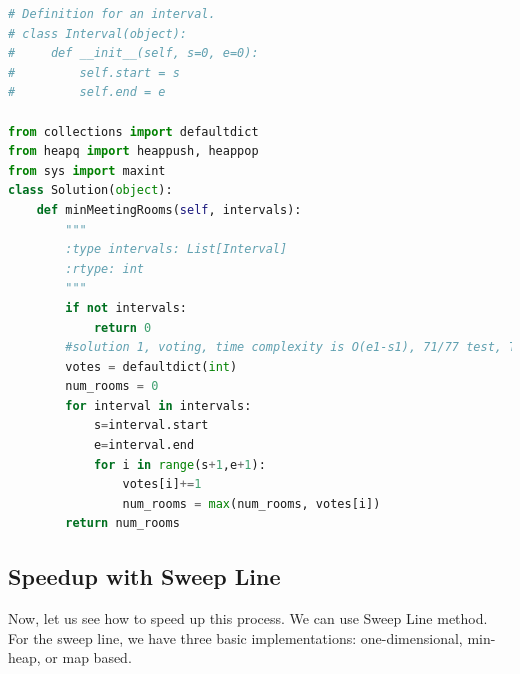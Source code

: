 \documentclass[../../main.tex]{subfiles}
\begin{document}
\begin{lstlisting}[language = Python]
# Definition for an interval.
# class Interval(object):
#     def __init__(self, s=0, e=0):
#         self.start = s
#         self.end = e

from collections import defaultdict
from heapq import heappush, heappop
from sys import maxint
class Solution(object):
    def minMeetingRooms(self, intervals):
        """
        :type intervals: List[Interval]
        :rtype: int
        """
        if not intervals:
            return 0
        #solution 1, voting, time complexity is O(e1-s1), 71/77 test, TLE
        votes = defaultdict(int)
        num_rooms = 0   
        for interval in intervals:
            s=interval.start
            e=interval.end
            for i in range(s+1,e+1):
                votes[i]+=1
                num_rooms = max(num_rooms, votes[i])
        return num_rooms
\end{lstlisting}
\subsection{Speedup with Sweep Line}
Now, let us see how to speed up this process. We can use Sweep Line method. For the sweep line, we have three basic implementations: one-dimensional, min-heap, or map based. 
\end{document}
